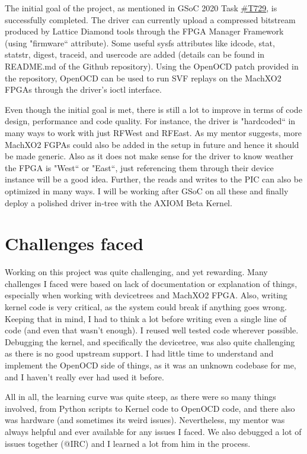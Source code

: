 \documentclass{article}
\begin{document}
The initial goal of the project, as mentioned in GSoC 2020 Task 
\href{https://lab.apertus.org/T729}{\#T729}, is successfully completed.
The driver can currently upload a compressed bitstream produced by Lattice Diamond
tools through the FPGA Manager Framework (using "firmware`` attribute).
Some useful sysfs attributes like
idcode, stat, statstr, digest, traceid, and usercode are added (details can
be found in README.md of the Github repository). Using the OpenOCD patch provided
in the repository, OpenOCD can be used to run SVF replays on the MachXO2 FPGAs
through the driver's ioctl interface.\newline

Even though the initial goal is met, there is still a lot to improve in terms
of code design, performance and code quality. For instance, the driver is
"hardcoded`` in many ways to work with just RFWest and RFEast. As my mentor
suggests, more MachXO2 FGPAs could also be added in the setup in future and hence
it should be made generic. Also as it does not make sense for the driver to know
weather the FPGA is "West`` or "East``, just referencing them through their
device instance will be a good idea. Further, the reads and writes to the PIC
can also be optimized in many ways. I will be working after GSoC on all
these and finally deploy a polished driver in-tree with the AXIOM Beta Kernel.

\newpage

\section{Challenges faced}

Working on this project was quite challenging, and yet rewarding. Many challenges
I faced were based on lack of documentation or explanation of things, especially
when working with devicetrees and MachXO2 FPGA. Also, writing kernel code is
very critical, as the system could break if anything goes wrong. Keeping that
in mind, I had to think
a lot before writing even a single line of code (and even that wasn't enough).
I reused well tested code wherever possible. Debugging the kernel,
and specifically the devicetree, was also quite challenging as there is no
good upstream support.
I had little time to understand and implement the OpenOCD side of things,
as it was an unknown codebase for me, and I haven't really
ever had used it before.\newline

All in all, the learning curve was quite steep, as there were so many
things involved, from Python scripts to Kernel code to OpenOCD code, and there
also was hardware (and sometimes its weird issues). Nevertheless, my mentor
was always helpful and ever available for any issues I faced. We also debugged
a lot of issues together (@IRC) and I learned a lot from him in the process.
\end{document}
